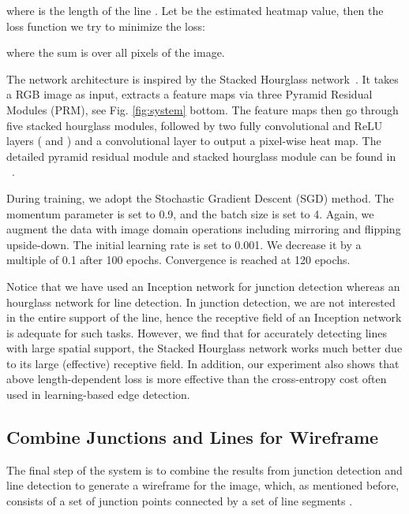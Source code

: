 \documentclass[10pt,twocolumn,letterpaper]{article}
\begin{document}
where  is the length of the line . Let  be the estimated heatmap value, then the loss function we try to minimize the  loss:\vspace{-2mm}

where the sum is over all pixels of the image. 

  The network architecture is inspired by the Stacked Hourglass network~\cite{NewellYD16}. It takes a  RGB image as input, extracts a  feature maps via three Pyramid Residual Modules (PRM), see Fig. \ref{fig:system} bottom. The feature maps then go through five stacked hourglass modules, followed by two fully convolutional and ReLU layers ( and ) and a  convolutional layer  to output a  pixel-wise heat map. The detailed pyramid residual module and stacked hourglass module can be found in ~\cite{NewellYD16}.

During training, we adopt the Stochastic Gradient Descent (SGD) method. The momentum parameter is set to 0.9, and the batch size is set to 4. Again, we augment the data with image domain operations including mirroring and flipping upside-down. The initial learning rate is set to 0.001. We decrease it by a multiple of 0.1 after 100 epochs. Convergence is reached at 120 epochs.

Notice that we have used an Inception network for junction detection whereas an hourglass network for line detection. In junction detection, we are not interested in the entire support of the line, hence the receptive field of an Inception network is adequate for such tasks. However, we find that for accurately detecting lines with large spatial support, the Stacked Hourglass network works much better due to its large (effective) receptive field. In addition, our experiment also shows that above length-dependent  loss is more effective than the cross-entropy cost often used in learning-based edge detection.  


\subsection{Combine Junctions and Lines for Wireframe}
The final step of the system is to combine the results from junction detection and line detection to generate a wireframe  for the image, which, as mentioned before, consists of a set of junction points  connected by a set of line segments . 
\end{document}
